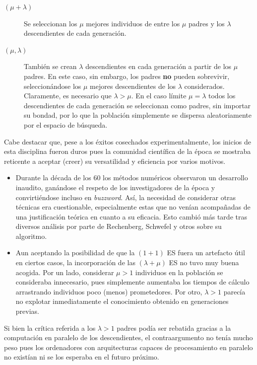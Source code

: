 \documentclass[12pt]{article} \usepackage[utf8x]{inputenc}
\begin{document}
\begin{description}
\item[$(\mu + \lambda)$] Se seleccionan los $\mu$
  mejores individuos de entre los $\mu$ padres y los $\lambda$
  descendientes de cada generación.
\item[$(\mu, \lambda)$] También se crean $\lambda$ descendientes en
  cada generación a partir de los $\mu$ padres. En este caso, sin
  embargo, los padres \textbf{no} pueden sobrevivir, seleccionándose
  los $\mu$ mejores descendientes de los $\lambda$
  considerados. Claramente, es necesario que $\lambda > \mu$. En el
  caso límite $\mu = \lambda$ todos los descendientes de cada
  generación se seleccionan como padres, sin importar su bondad, por
  lo que la población simplemente se dispersa aleatoriamente por el
  espacio de búsqueda.
\end{description}

Cabe destacar que, pese a los éxitos cosechados experimentalmente, los
inicios de esta disciplina fueron duros pues la comunidad científica
de la época se mostraba reticente a aceptar (creer) su versatilidad y
eficiencia por varios motivos.

\begin{itemize}
\item Durante la década de los 60 los métodos numéricos observaron un
  desarrollo inaudito, ganándose el respeto de los investigadores de
  la época y convirtiéndose incluso en \textit{buzzword}. Así, la
  necesidad de considerar otras técnicas era cuestionable,
  especialmente estas que no venían acompañadas de una justificación
  teórica en cuanto a su eficacia. Esto cambió más tarde tras diversos
  análisis por parte de Rechenberg, Schwefel y otros sobre su
  algoritmo.
\item Aun aceptando la posibilidad de que la $(1 + 1)$ ES fuera un
  artefacto útil en ciertos casos, la incorporación de las $(\lambda +
  \mu)$ ES no tuvo muy buena acogida. Por un lado, considerar $\mu >
  1$ individuos en la población se consideraba innecesario, pues
  simplemente aumentaba los tiempos de cálculo arrastrando individuos
  poco (menos) prometedores. Por otro, $\lambda > 1$ parecía no
  explotar inmediatamente el conocimiento obtenido en generaciones previas.
\end{itemize}

Si bien la crítica referida a los $\lambda > 1$ padres podía ser
rebatida gracias a la computación en paralelo de los descendientes, el
contraargumento no tenía mucho peso pues los ordenadores con
arquitecturas capaces de procesamiento en paralelo no existían ni se
los esperaba en el futuro próximo. \\
\end{document}
